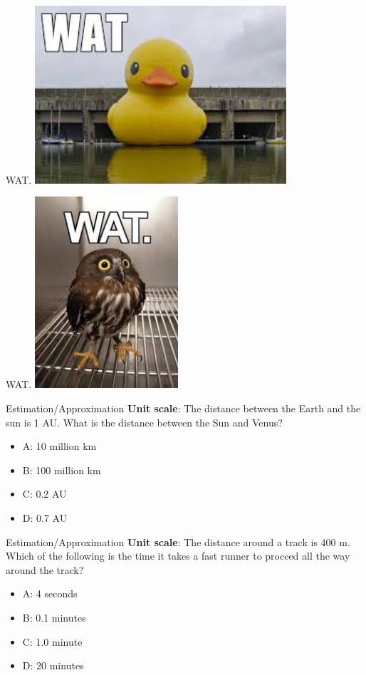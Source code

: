 \documentclass{beamer}
\begin{document}
\begin{frame}{WAT.}
\centering
\includegraphics[width=0.7\textwidth]{figures/watduck.jpeg}
\end{frame}

\begin{frame}{WAT.}
\centering
\includegraphics[width=0.4\textwidth]{figures/watowl.jpeg}
\end{frame}

\begin{frame}{Estimation/Approximation}
\textbf{Unit scale}: The distance between the Earth and the sun is 1 AU.  What is the distance between the Sun and Venus?
\begin{itemize}
\item A: 10 million km
\item B: 100 million km
\item C: 0.2 AU
\item D: 0.7 AU
\end{itemize}
\end{frame}

\begin{frame}{Estimation/Approximation}
\textbf{Unit scale}: The distance around a track is 400 m.  Which of the following is the time it takes a fast runner to proceed all the way around the track?
\begin{itemize}
\item A: 4 seconds
\item B: 0.1 minutes
\item C: 1.0 minute
\item D: 20 minutes
\end{itemize}
\end{frame}
\end{document}
